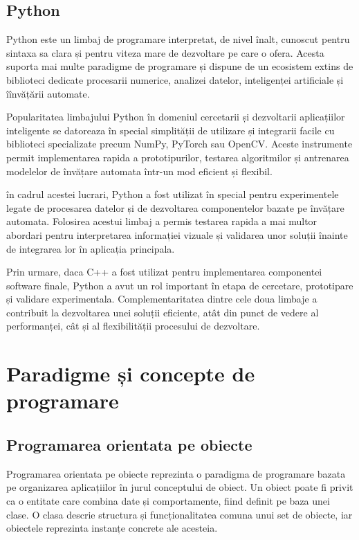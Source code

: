 \subsection*{Python}

Python este un limbaj de programare interpretat, de nivel înalt, cunoscut pentru sintaxa sa clara și pentru viteza mare de dezvoltare pe care o ofera. Acesta suporta mai multe paradigme de programare și dispune de un ecosistem extins de biblioteci dedicate procesarii numerice, analizei datelor, inteligenței artificiale și îînvățării automate.

Popularitatea limbajului Python în domeniul cercetarii și dezvoltarii aplicațiilor inteligente se datoreaza în special simplității de utilizare și integrarii facile cu biblioteci specializate precum NumPy, PyTorch sau OpenCV. Aceste instrumente permit implementarea rapida a prototipurilor, testarea algoritmilor și antrenarea modelelor de învățare automata într-un mod eficient și flexibil.

în cadrul acestei lucrari, Python a fost utilizat în special pentru experimentele legate de procesarea datelor și de dezvoltarea componentelor bazate pe învățare automata. Folosirea acestui limbaj a permis testarea rapida a mai multor abordari pentru interpretarea informației vizuale și validarea unor soluții înainte de integrarea lor în aplicația principala.

Prin urmare, daca C++ a fost utilizat pentru implementarea componentei software finale, Python a avut un rol important în etapa de cercetare, prototipare și validare experimentala. Complementaritatea dintre cele doua limbaje a contribuit la dezvoltarea unei soluții eficiente, atât din punct de vedere al performanței, cât și al flexibilității procesului de dezvoltare.

\section{Paradigme și concepte de programare}

\subsection*{Programarea orientata pe obiecte}

Programarea orientata pe obiecte reprezinta o paradigma de programare bazata pe organizarea aplicațiilor în jurul conceptului de obiect. Un obiect poate fi privit ca o entitate care combina date și comportamente, fiind definit pe baza unei clase. O clasa descrie structura și funcționalitatea comuna unui set de obiecte, iar obiectele reprezinta instanțe concrete ale acesteia.

